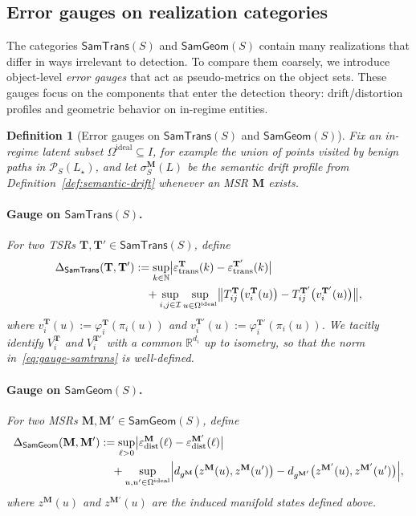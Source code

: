 \documentclass[11pt]{article}
\newtheorem{definition}{Definition}
\newcommand{\SamTrans}{\mathsf{SamTrans}}
\newcommand{\SamGeom}{\mathsf{SamGeom}}
\begin{document}
\subsection{Error gauges on realization categories}
\label{subsec:error-gauges}

The categories $\SamTrans(S)$ and $\SamGeom(S)$ contain many realizations that differ in ways
irrelevant to detection. To compare them coarsely, we introduce object-level \emph{error gauges}
that act as pseudo-metrics on the object sets. These gauges focus on the components that enter
the detection theory: drift/distortion profiles and geometric behavior on in-regime entities.

\begin{definition}[Error gauges on $\SamTrans(S)$ and $\SamGeom(S)$]
\label{def:error-gauges}
Fix an in-regime latent subset $\Omega^{\mathrm{ideal}} \subseteq I$, for example the union of points
visited by benign paths in $\mathcal{P}_S(L_\star)$, and let $\sigma_S^{\mathbf{M}}(L)$ be the semantic
drift profile from Definition~\ref{def:semantic-drift} whenever an MSR $\mathbf{M}$ exists.

\paragraph{Gauge on $\SamTrans(S)$.}
For two TSRs $\mathbf{T}, \mathbf{T}' \in \SamTrans(S)$, define
\begin{align}
\Delta_{\SamTrans}(\mathbf{T}, \mathbf{T}')
&:=
\sup_{k \in \mathbb{N}}
\bigl|
\varepsilon_{\mathrm{trans}}^{\mathbf{T}}(k)
-
\varepsilon_{\mathrm{trans}}^{\mathbf{T}'}(k)
\bigr|
\notag\\
&\quad+
\sup_{i,j \in \mathcal{I}}
\sup_{u \in \Omega^{\mathrm{ideal}}}
\bigl\|
T_{ij}^{\mathbf{T}}\bigl(v_i^{\mathbf{T}}(u)\bigr)
-
T_{ij}^{\mathbf{T}'}\bigl(v_i^{\mathbf{T}'}(u)\bigr)
\bigr\|,
\label{eq:gauge-samtrans}
\end{align}
where
$v_i^{\mathbf{T}}(u) := \varphi_i^{\mathbf{T}}(\pi_i(u))$ and
$v_i^{\mathbf{T}'}(u) := \varphi_i^{\mathbf{T}'}(\pi_i(u))$.
We tacitly identify $V_i^{\mathbf{T}}$ and $V_i^{\mathbf{T}'}$ with a common $\mathbb{R}^{d_i}$ up to
isometry, so that the norm in~\eqref{eq:gauge-samtrans} is well-defined.

\paragraph{Gauge on $\SamGeom(S)$.}
For two MSRs $\mathbf{M}, \mathbf{M}' \in \SamGeom(S)$, define
\begin{align}
\Delta_{\SamGeom}(\mathbf{M}, \mathbf{M}')
&:=
\sup_{\ell > 0}
\bigl|
\varepsilon_{\mathrm{dist}}^{\mathbf{M}}(\ell)
-
\varepsilon_{\mathrm{dist}}^{\mathbf{M}'}(\ell)
\bigr|
\notag\\
&\quad+
\sup_{u, u' \in \Omega^{\mathrm{ideal}}}
\Bigl|
d_{g^{\mathbf{M}}}\bigl(z^{\mathbf{M}}(u), z^{\mathbf{M}}(u')\bigr)
-
d_{g^{\mathbf{M}'}}\bigl(z^{\mathbf{M}'}(u), z^{\mathbf{M}'}(u')\bigr)
\Bigr|,
\label{eq:gauge-samgeom}
\end{align}
where $z^{\mathbf{M}}(u)$ and $z^{\mathbf{M}'}(u)$ are the induced manifold states defined above.
\end{definition}
\end{document}

